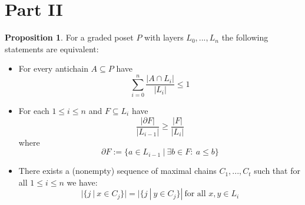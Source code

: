 \documentclass{scrartcl}
\theoremstyle{definition}
\newtheorem{proposition}[definition]{Proposition}
\begin{document}
\section{Part II}
\begin{proposition}
    For a graded poset $P$ with layers $L_0, ..., L_n$ the following statements are equivalent:
    \begin{itemize}
        \item For every antichain $A \subseteq P$ have
        \begin{equation*}
            \sum_{i = 0}^n \frac {|A \cap L_i|} {|L_i|} \leq 1
        \end{equation*}
        \item For each $1 \leq i \leq n$ and $F \subseteq L_i$ have
        \begin{equation*}
            \frac {|\partial F|} {|L_{i - 1}|} \geq \frac {|F|} {|L_i|}
        \end{equation*}
        where
        \begin{equation*}
            \partial F := \{ a \in L_{i - 1} \ | \ \exists b \in F: \ a \leq b \}
        \end{equation*}
        \item There exists a (nonempty) sequence of maximal chains $C_1, ..., C_t$ such that for all $1 \leq i \leq n$ we have:
        \begin{equation*}
            |\{ j \ | \ x \in C_j \}| = |\{ j \ | \ y \in C_j \}| \ \text{for all $x, y \in L_i$}
        \end{equation*}
    \end{itemize}
\end{proposition}
\end{document}
